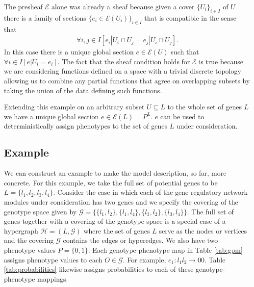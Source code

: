 The presheaf $\mathcal{E}$ alone was already a sheaf because given a cover $\{U_i\}_{i \in I}$ of $U$ there is a family of sections $\{e_i \in \mathcal{E}(U_i)\}_{i \in I}$ that is compatible in the sense that
\begin{eqnarray}
\forall i,j \in I \left[ e_i|U_i \cap U_j = e_j|U_i \cap U_j \right].
\end{eqnarray}
In this case there is a unique global section $e \in \mathcal{E}(U)$ such that $\forall i \in I \left[ e|U_i = e_i \right]$. The fact that the sheaf condition holds for $\mathcal{E}$ is true because we are considering functions defined on a space with a trivial discrete topology allowing us to combine any partial functions that agree on overlapping subsets by taking the union of the data defining such functions.

Extending this example on an arbitrary subset $U \subseteq L$ to the whole set of genes $L$ we have a unique global section $e \in \mathcal{E}(L) = P^L$. $e$ can be used to deterministically assign phenotypes to the set of genes $L$ under consideration.

\subsection*{Example}
We can construct an example to make the model description, so far, more concrete. For this example, we take the full set of potential genes to be $L = \{ l_1,l_2,l_3,l_4 \}$. Consider the case in which each of the gene regulatory network modules under consideration has two genes and we specify the covering of the genotype space given by $\mathcal{G} = \{\{l_1,l_2 \},\{l_1,l_4 \},\{l_3,l_2\},\{l_3,l_4\} \}$. The full set of genes together with a covering of the genotype space is a special case of a hypergraph $\mathcal{H} = (L,\mathcal{G})$ where the set of genes $L$ serve as the nodes or vertices and the covering $\mathcal{G}$ contains the edges or hyperedges. We also have two phenotype values $P = \{0, 1\}$. Each genotype-phenotype map in Table \ref{tab:gpm} assigns phenotype values to each $O \in \mathcal{G}$. For example, $e_1 \colon   l_1 l_2 \rightarrow 00$. Table \ref{tab:probabilities} likewise assigns probabilities to each of these genotype-phenotype mappings.

